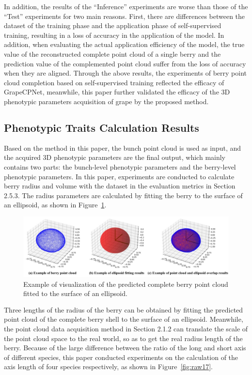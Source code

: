 \documentclass[12pt]{article}
\begin{document}
In addition, the results of the ``Inference'' experiments are worse than those of the ``Test'' experiments for two main reasons.
First, there are differences between the dataset of the training phase and the application phase of self-supervised training, resulting in a loss of accuracy in the application of the model. 
In addition, when evaluating the actual application efficiency of the model, the true value of the reconstructed complete point cloud of a single berry and the prediction value of the complemented point cloud suffer from the loss of accuracy when they are aligned.
Through the above results, the experiments of berry point cloud completion based on self-supervised training reflected the efficacy of GrapeCPNet, meanwhile, this paper further validated the efficacy of the 3D phenotypic parameters acquisition of grape by the proposed method.

\subsection{Phenotypic Traits Calculation Results}

Based on the method in this paper, the bunch point cloud is used as input, and the acquired 3D phenotypic parameters are the final output, which mainly contains two parts: the bunch-level phenotypic parameters and the berry-level phenotypic parameters.
In this paper, experiments are conducted to calculate berry radius and volume with the dataset in the evaluation metrics in 
Section 2.5.3.
The radius parameters are calculated by fitting the berry to the surface of an ellipsoid, as shown in Figure~\ref{fig:raw16}.

\begin{figure}[hbt!]
    \centering
    \includegraphics[width=1\textwidth]{figures/Figure13.pdf}
    \caption{Example of visualization of the predicted complete berry point cloud fitted to the surface of an ellipsoid.}
    \label{fig:raw16}
\end{figure}

Three lengths of the radius of the berry can be obtained by fitting the predicted point cloud of the complete berry shell to the surface of an ellipsoid. 
Meanwhile, the point cloud data acquisition method in 
Section 2.1.2 can translate the scale of the point cloud space to the real world, so as to get the real radius length of the berry.
Because of the large difference between the ratio of the long and short axis of different species, this paper conducted experiments on the calculation of the axis length of four species respectively, as shown in Figure~\ref{fig:raw17}.
\end{document}
